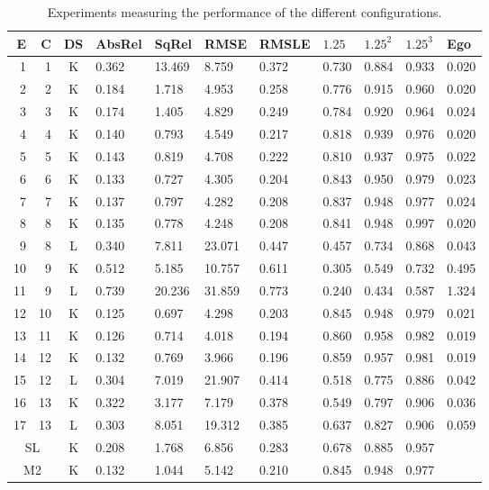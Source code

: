 \begin{table}[H]
{\setlength{\tabcolsep}{0.4em}
\begin{tabular}{|r|r|c||l|l|l|l||l|l|l||l|}
\hline
E & C & DS & AbsRel & SqRel & RMSE & RMSLE & $1.25$ & $1.25^2$ & $1.25^3$ & Ego \\
\hline
1 & 1 & K & 0.362 & 13.469 & 8.759 & 0.372 & 0.730 & 0.884 & 0.933 & 0.020 \\
\hline
2 & 2 & K & 0.184 & 1.718 & 4.953 & 0.258 & 0.776 & 0.915 & 0.960 & 0.020 \\
\hline
3 & 3 & K & 0.174 & 1.405 & 4.829 & 0.249 & 0.784 & 0.920 & 0.964 & 0.024 \\
\hline
4 & 4 & K & 0.140 & 0.793 & 4.549 & 0.217 & 0.818 & 0.939 & 0.976 & 0.020 \\
\hline
5 & 5 & K & 0.143 & 0.819 & 4.708 & 0.222 & 0.810 & 0.937 & 0.975 & 0.022 \\
\hline
6 & 6 & K & 0.133 & 0.727 & 4.305 & 0.204 & 0.843 & 0.950 & 0.979 & 0.023 \\
\hline
7 & 7 & K & 0.137 & 0.797 & 4.282 & 0.208 & 0.837 & 0.948 & 0.977 & 0.024 \\
\hline
8 & 8 & K & 0.135 & 0.778 & 4.248 & 0.208 & 0.841 & 0.948 & 0.997 & 0.020 \\
\hline
9 & 8 & L & 0.340 & 7.811 & 23.071 & 0.447 & 0.457 & 0.734 & 0.868 & 0.043 \\
\hline
10 & 9 & K & 0.512 & 5.185 & 10.757 & 0.611 & 0.305 & 0.549 & 0.732 & 0.495 \\
\hline
11 & 9 & L & 0.739 & 20.236 & 31.859 & 0.773 & 0.240 & 0.434 & 0.587 & 1.324 \\
\hline
12 & 10 & K & 0.125 & 0.697 & 4.298 & 0.203 & 0.845 & 0.948 & 0.979 & 0.021 \\
\hline
13 & 11 & K & 0.126 & 0.714 & 4.018 & 0.194 & 0.860 & 0.958 & 0.982 & 0.019 \\
\hline
14 & 12 & K & 0.132 & 0.769 & 3.966 & 0.196 & 0.859 & 0.957 & 0.981 & 0.019 \\
\hline
15 & 12 & L & 0.304 & 7.019 & 21.907 & 0.414 & 0.518 & 0.775 & 0.886 & 0.042 \\
\hline
16 & 13 & K & 0.322 & 3.177 & 7.179 & 0.378 & 0.549 & 0.797 & 0.906 & 0.036 \\
\hline
17 & 13 & L & 0.303 & 8.051 & 19.312 & 0.385 & 0.637 & 0.827 & 0.906 & 0.059 \\
\hline
\hline
\multicolumn{2}{|c|}{SL} & K & 0.208 & 1.768 & 6.856 & 0.283 & 0.678 & 0.885 & 0.957 &  \\
\hline
\multicolumn{2}{|c|}{M2} & K & 0.132 & 1.044 & 5.142 & 0.210 & 0.845 & 0.948 & 0.977 & \\
\hline
\end{tabular}}
\caption{Experiments measuring the performance of the different configurations.}
\label{table:experiments}
\end{table}

